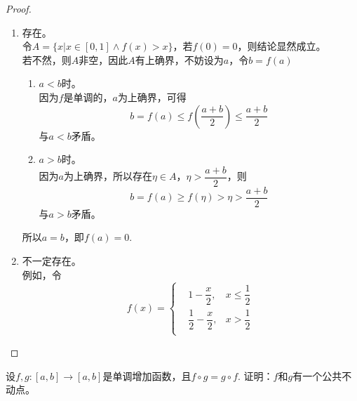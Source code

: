 \begin{proof}

    \begin{enumerate}

        \item 
            存在。\\
            令\(A = \{x | x \in [0, 1] \land f(x) > x \} \)，若\(f(0) = 0\)，则结论显然成立。\\
            若不然，则\(A\)非空，因此\(A\)有上确界，不妨设为\(a\)，令\(b = f(a)\)

            \begin{enumerate}

                \item \(a < b\)时。\\
                    因为\(f\)是单调的，\(a\)为上确界，可得
                    \[b = f(a) \leq f\left( \dfrac{a + b}{2} \right) \leq \dfrac{a + b}{2}\]
                    与\(a < b\)矛盾。

                \item 
                    \(a > b\)时。\\
                    因为\(a\)为上确界，所以存在\(\eta \in A\)，\(\eta > \dfrac{a + b}{2}\)，则
                    \[b = f(a) \geq f(\eta) > \eta > \dfrac{a + b}{2}\]
                    与\(a > b\)矛盾。

            \end{enumerate}

            所以\(a = b\)，即\(f(a) = 0\).
        
        \item 
            不一定存在。\\
            例如，令
            \[
                f(x) = \left\{
                \begin{aligned}
                    & 1 - \dfrac{x}{2}, &x \leq \dfrac{1}{2} \\
                    & \dfrac{1}{2} - \dfrac{x}{2} , &x > \dfrac{1}{2} \\
                \end{aligned}
                \right.
            \]
            
    \end{enumerate}

\end{proof}

\begin{proposition}

    设\(f, g :[a, b] \to [a, b]\)是单调增加函数，且\(f \circ g = g \circ f\). 证明：\(f\)和\(g\)有一个公共不动点。

\end{proposition}

